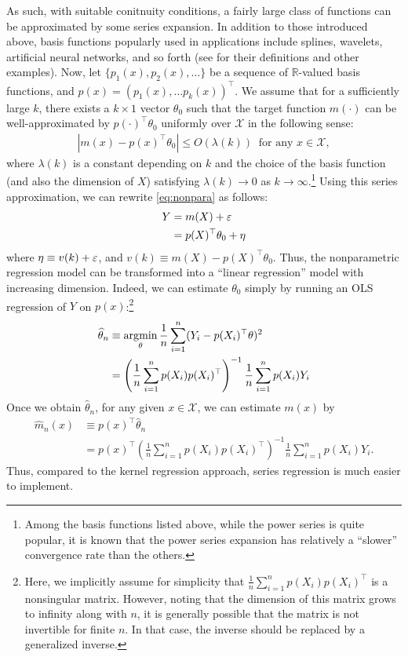 \documentclass[11pt, A4paper, openany, uplatex]{book}
\begin{document}
As such, with suitable conitnuity conditions, a fairly large class of functions can be approximated by some series expansion.
In addition to those introduced above, basis functions popularly used in applications include splines, wavelets, artificial neural networks, and so forth (see \cite{chen2007large} for their definitions and other examples).
Now, let $\{p_1(x), p_2(x), \ldots \}$ be a sequence of $\mathbb{R}$-valued basis functions, and $p(x) = (p_1(x), \ldots p_k(x))^\top$.
We assume that for a sufficiently large $k$, there exists a $k \times 1$ vector $\theta_0$ such that the target function $m(\cdot)$ can be well-approximated by $p(\cdot)^\top\theta_0$ uniformly over $\mathcal{X}$ in the following sense:
\begin{align*}
	|m(x) - p(x)^\top\theta_0 | \le O(\lambda(k)) \;\; \text{for any $x \in \mathcal{X}$},
\end{align*}
where $\lambda(k)$ is a constant depending on $k$ and the choice of the basis function (and also the dimension of $X$) satisfying $\lambda(k) \to 0$ as $k \to \infty$.\footnote{
	Among the basis functions listed above, while the power series is quite popular, it is known that the power series expansion has relatively a ``slower'' convergence rate than the others.
}
Using this series approximation, we can rewrite \eqref{eq:nonpara} as follows:
\begin{align*}
	Y
	& = m(X) + \varepsilon\\
	& = p(X)^\top\theta_0 + \eta
\end{align*}
where $\eta \equiv v(k) + \varepsilon$, and $v(k) \equiv m(X) - p(X)^\top\theta_0$.
Thus, the nonparametric regression model can be transformed into a ``linear regression'' model with increasing dimension.
Indeed, we can estimate $\theta_0$ simply by running an OLS regression of $Y$ on $p(x)$:\footnote{
	Here, we implicitly assume for simplicity that $\frac{1}{n}\sum_{i = 1}^n p(X_i)p(X_i)^\top$ is a nonsingular matrix.
	However, noting that the dimension of this matrix grows to infinity along with $n$, it is generally possible that the matrix is not invertible for finite $n$.
	In that case, the inverse should be replaced by a generalized inverse.
	}
\begin{align*}
	\widehat \theta_n 
	& \equiv \operatorname*{\arg\!\min}_\theta \frac{1}{n}\sum_{i = 1}^n (Y_i -  p(X_i)^\top\theta)^2 \\
	& = \left(\frac{1}{n}\sum_{i = 1}^n p(X_i)p(X_i)^\top\right)^{-1}\frac{1}{n}\sum_{i = 1}^n p(X_i)Y_i
\end{align*}
Once we obtain $\hat \theta_n$, for any given $x \in \mathcal{X}$, we can estimate $m(x)$ by 
\begin{align*}
	\hat m_n(x) 
	& \equiv p(x)^\top \hat \theta_n \\ 
	& = p(x)^\top \left(\frac{1}{n}\sum_{i = 1}^n p(X_i)p(X_i)^\top\right)^{-1}\frac{1}{n}\sum_{i = 1}^n p(X_i)Y_i.
\end{align*}
Thus, compared to the kernel regression approach, series regression is much easier to implement.
\end{document}
